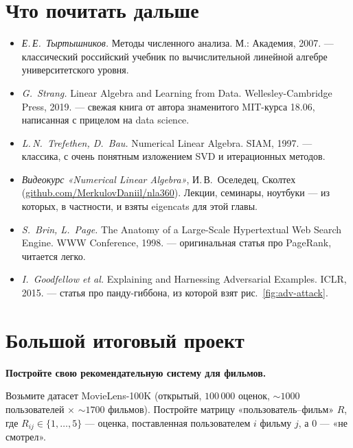 \section*{Что почитать дальше}

\begin{itemize}\itemsep1pt
  \item \emph{Е.\,Е.~Тыртышников.} Методы численного анализа. М.: Академия, 2007. ---
        классический российский учебник по вычислительной линейной
        алгебре университетского уровня.
  \item \emph{G.~Strang.} Linear Algebra and Learning from Data. Wellesley-Cambridge Press, 2019. ---
        свежая книга от автора знаменитого MIT-курса 18.06, написанная
        с прицелом на data science.
  \item \emph{L.\,N.~Trefethen, D.~Bau.} Numerical Linear Algebra. SIAM, 1997. ---
        классика, с очень понятным изложением SVD и итерационных методов.
  \item \emph{Видеокурс «Numerical Linear Algebra»}, И.\,В.~Оселедец, Сколтех
        (\href{https://github.com/MerkulovDaniil/nla360}{github.com/MerkulovDaniil/nla360}).
        Лекции, семинары, ноутбуки --- из которых, в частности,
        и взяты eigencats для этой главы.
  \item \emph{S.~Brin, L.~Page.} The Anatomy of a Large-Scale
        Hypertextual Web Search Engine. WWW Conference, 1998. ---
        оригинальная статья про PageRank, читается легко.
  \item \emph{I.~Goodfellow et al.} Explaining and Harnessing
        Adversarial Examples. ICLR, 2015. ---
        статья про панду-гиббона, из которой взят рис.~\ref{fig:adv-attack}.
\end{itemize}

\section*{Большой итоговый проект}

\textbf{Постройте свою рекомендательную систему для фильмов.}

Возьмите датасет MovieLens-100K (открытый, $100\,000$ оценок,
$\sim 1000$ пользователей $\times$ $\sim 1700$ фильмов). Постройте
матрицу «пользователь--фильм» $R$, где $R_{ij}\in\{1,\ldots,5\}$ —
оценка, поставленная пользователем $i$ фильму $j$, а $0$ — «не смотрел».

